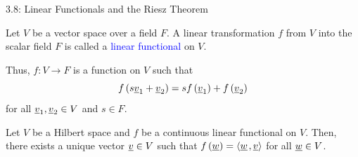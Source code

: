 \documentclass[10pt,letterpaper,english]{beamer}
\begin{document}
\begin{frame}{3.8: Linear Functionals and the Riesz Theorem}

\begin{definition}
Let $V$ be a vector space over a field $F$.
A linear transformation $f$ from $V$ into the scalar field $F$ is called a \textcolor{blue}{linear functional} on $V$.
\end{definition}

\begin{example}
Thus, $f\colon V \to F$ is a function on $V$ such that
\begin{equation*}
f \left( s \underline{v}_1 + \underline{v}_2 \right)
= s f \left( \underline{v}_1 \right) + f \left( \underline{v}_2 \right)
\end{equation*}
for all $\underline{v}_1, \underline{v}_2 \in V$ and $s \in F$.
\end{example}

\begin{theorem}[Riesz]
Let $V$ be a Hilbert space and $f$ be a continuous linear functional on $V$.
Then, there exists a unique vector $\underline{v} \in V$ such that $f \left( \underline{w} \right) = {\left\langle  \underline{w}  \mskip2mu ,  \underline{v}  \right\rangle}$ for all $\underline{w} \in V$.
\end{theorem}

\end{frame}
\end{document}
